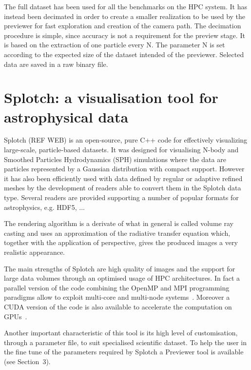 \documentclass{egpubl}
\begin{document}
The full dataset has been used for all the benchmarks on the HPC system. It has
instead been decimated in order to create a smaller realization to be
used by the previewer for fast exploration and creation of the camera path. The decimation
procedure is simple, since accuracy is not a requirement for the preview stage. It is based on the
extraction of one particle every N. The parameter N is set according to the expected size
of the dataset intended of the previewer. Selected data are saved in a raw binary file.

\section{Splotch: a visualisation tool for astrophysical data}

Splotch (REF WEB) is an open-source, pure C++ code for effectively visualizing large-scale, particle-based datasets. It was designed for visualising N-body and Smoothed Particles Hydrodynamics (SPH) simulations where the data are particles represented by a Gaussian distribution with compact support. However it has also been efficiently used with data defined by regular or adaptive refined meshes by the development of readers able to convert them in the Splotch data type. Several readers are provided supporting a number of popular formats for astrophysics, e.g. HDF5, ...

The rendering algorithm is a derivate of what in general is called volume ray casting and uses an approximation of the radiative transfer equation
which, together with the application of perspective, gives the produced images a very realistic appearance. 

The main strengths of Splotch are high quality of images and the support for large data volumes through an optimised usage of HPC architectures. In fact a parallel version of the code combining the OpenMP and MPI programming paradigms allow to exploit multi-core and multi-node systems~\cite{JKR*10}. Moreover a CUDA version of the code is also available to accelerate the computation on GPUs~\cite{RGD*14}. 

Another important characteristic of this tool is its high level of customisation, through a parameter file, to suit specialised scientific dataset. To help the user in the fine tune of the parameters required by Splotch a Previewer tool is available (see Section~3).

\end{document}
